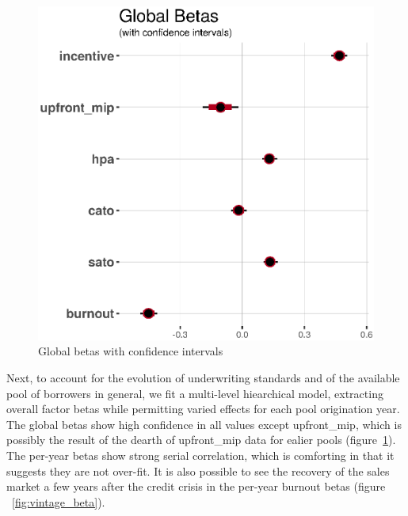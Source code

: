 \documentclass{article}
\begin{document}
\begin{figure}
	\centering
	\includegraphics[scale=0.5]{white_paper_files/global_betas}
	\caption{Global betas with confidence intervals}
	\label{fig:global_beta}
\end{figure}
Next, to account for the evolution of underwriting standards and of the available pool of borrowers in general, we fit a multi-level hiearchical model, extracting overall factor betas while permitting varied effects for each pool origination year. The global betas show high confidence in all values except upfront\_mip, which is possibly the result of the dearth of upfront\_mip data for ealier pools (figure~\ref{fig:global_beta}). The per-year betas show strong serial correlation, which is comforting in that it suggests they are not over-fit. It is also possible to see the recovery of the sales market a few years after the credit crisis in the per-year burnout betas (figure ~\ref{fig:vintage_beta}).
\end{document}

